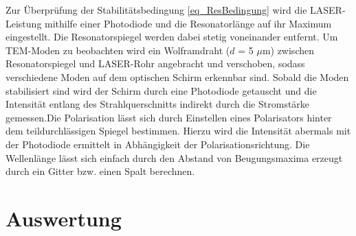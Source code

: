 Zur Überprüfung der Stabilitätsbedingung \eqref{eq_ResBedingung} wird die LASER-Leistung mithilfe einer Photodiode und die Resonatorlänge auf ihr Maximum eingestellt. Die 
Resonatorspiegel werden dabei stetig voneinander entfernt. Um TEM-Moden zu beobachten wird ein Wolframdraht ($d$ = 5 $\mu$m) zwischen Resonatorspiegel und LASER-Rohr angebracht und verschoben, sodass verschiedene
Moden auf dem optischen Schirm erkennbar sind. Sobald die Moden stabilisiert sind wird der Schirm durch eine Photodiode getauscht und die Intensität 
entlang des Strahlquerschnitts indirekt durch die Stromstärke gemessen.Die Polarisation lässt sich durch Einstellen eines Polarisators hinter dem teildurchlässigen Spiegel bestimmen. Hierzu wird die Intensität abermals mit
der Photodiode ermittelt in Abhängigkeit der Polarisationsrichtung. Die Wellenlänge lässt sich einfach durch den Abstand von Beugungsmaxima erzeugt
durch ein Gitter bzw. einen Spalt berechnen.
\section{Auswertung}
